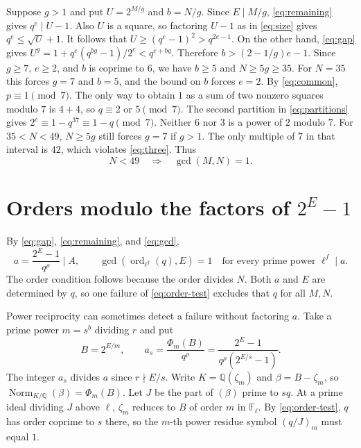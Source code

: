\documentclass[11pt]{article}
\DeclareMathOperator{\ord}{ord}
\begin{document}
Suppose $g>1$ and put $U=2^{M/g}$ and $b=N/g$. Since $E\mid M/g$,
\eqref{eq:remaining} gives $q^e\mid U-1$. Also $U$ is a square,
so factoring $U-1$ as in \eqref{eq:size} gives $q^e\le\sqrt U+1$.
It follows that $U\ge(q^e-1)^2>q^{2e-1}$. On the other hand,
\eqref{eq:gap} gives $U^g=1+q^e(q^{bg}-1)/2^c<q^{e+bg}$.
Therefore $b>(2-1/g)e-1$. Since $g\ge7$, $e\ge2$, and $b$ is coprime
to $6$, we have $b\ge5$ and $N\ge5g\ge35$.
For $N=35$ this forces $g=7$ and $b=5$, and the bound on $b$ forces $e=2$.
By \eqref{eq:common}, $p\equiv1\pmod7$. The only way to obtain $1$
as a sum of two nonzero squares modulo $7$ is $4+4$, so
$q\equiv2$ or $5\pmod7$. The second partition in
\eqref{eq:partitions} gives $2^c\equiv1-q^{37}\equiv1-q\pmod7$.
Neither $6$ nor $3$ is a power of $2$ modulo $7$.
For $35<N<49$, $N\ge5g$ still forces $g=7$ if $g>1$. The only
multiple of $7$ in that interval is $42$, which violates \eqref{eq:three}. Thus
\begin{equation}\label{eq:N49}
N<49\quad\Longrightarrow\quad \gcd(M,N)=1.
\end{equation}

\section{Orders modulo the factors of \texorpdfstring{$2^E-1$}{2\string^E-1}}
\label{sec:orders}

By \eqref{eq:gap}, \eqref{eq:remaining}, and \eqref{eq:gcd},
\begin{equation}\label{eq:order-test}
a=\frac{2^E-1}{q^\rho}\mid A,\qquad
\gcd(\ord_{\ell^f}(q),E)=1
\quad\text{for every prime power }\ell^f\mid a.
\end{equation}
The order condition follows because the order divides $N$.
Both $a$ and $E$ are determined by $q$, so one failure of
\eqref{eq:order-test} excludes that $q$ for all $M,N$.

Power reciprocity can sometimes detect a failure without factoring $a$.
Take a prime power $m=s^b$ dividing $r$ and put
\[
B=2^{E/m},\qquad
a_s=\frac{\Phi_m(B)}{q^\rho}
=\frac{2^E-1}{q^\rho(2^{E/s}-1)}.
\]
The integer $a_s$ divides $a$ since $r\nmid E/s$. Write
$K=\mathbb Q(\zeta_m)$ and $\beta=B-\zeta_m$, so
$\operatorname{Norm}_{K/\mathbb Q}(\beta)=\Phi_m(B)$.
Let $J$ be the part of $(\beta)$ prime to $sq$. At a prime ideal
dividing $J$ above $\ell$, $\zeta_m$ reduces to $B$ of order $m$ in
$\mathbb F_\ell$. By \eqref{eq:order-test}, $q$ has order coprime to
$s$ there, so the $m$-th power residue symbol $(q/J)_m$ must equal $1$.
\end{document}
